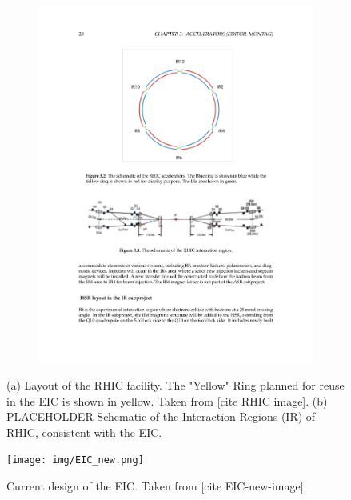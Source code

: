 \begin{figure}[ht]
\begin{subfigure}{.3\linewidth}
        \includegraphics[width=\linewidth]{img/IR.pdf}
        \vspace{.5cm}
        \caption{}
        \label{fig:eic:IR}
    \end{subfigure}
    \caption{(a) Layout of the RHIC facility. The "Yellow" Ring planned for reuse in the EIC is shown in yellow. Taken from [cite RHIC image]. (b) PLACEHOLDER Schematic of the Interaction Regions (IR) of RHIC, consistent with the EIC.}
\end{figure}

\begin{figure}[ht]
    \centering
    \texttt{[image: img/EIC\_new.png]}
    \caption{Current design of the EIC. Taken from [cite EIC-new-image].}
    \label{fig:eic:eic}
\end{figure}


